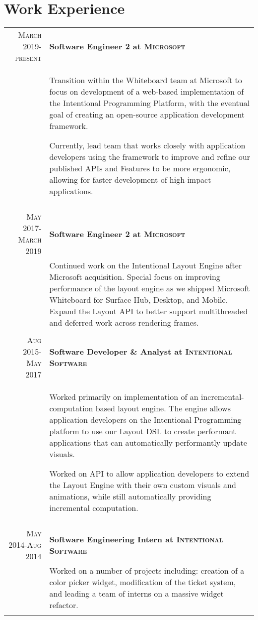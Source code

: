 \documentclass[letterpaper,10pt]{article} %
\newcommand{\work}[3]{ \textsc{#1} & \textbf{#2} \\
& #3\\
\multicolumn{2}{c}{} \\}
\begin{document}
\section{Work Experience}

\begin{tabular}{r|p{14.5cm}} %


\work{March 2019-present}{Software Engineer 2 at \textsc{Microsoft}}{
  Transition within the Whiteboard team at Microsoft to focus on development of a web-based implementation of the Intentional Programming Platform, with the eventual goal of creating an open-source application development framework.

  Currently, lead team that works closely with application developers using the framework to improve and refine our published APIs and Features to be more ergonomic, allowing for faster development of high-impact applications.
}


\work{May 2017-March 2019}{Software Engineer 2 at \textsc{Microsoft}}{
  Continued work on the Intentional Layout Engine after Microsoft acquisition. Special focus on improving performance of the layout engine as we shipped Microsoft Whiteboard
  for Surface Hub, Desktop, and Mobile. Expand the Layout API to better support multithreaded and deferred work across rendering frames.
}


\work{Aug 2015-May 2017}{Software Developer \& Analyst at \textsc{Intentional Software}}{
  Worked primarily on implementation of an incremental-computation based layout engine. The engine allows application developers on the Intentional Programming
  platform to use our Layout DSL to create performant applications that can automatically performantly update visuals. 

  Worked on API to allow application developers to extend the Layout Engine with their own custom visuals and animations, while still automatically providing incremental
  computation.
}


\work{May 2014-Aug 2014}{Software Engineering Intern at \textsc{Intentional Software}}{
	Worked on a number of projects including: creation of a color picker widget, modification of the ticket system, and
	leading a team of interns on a massive widget refactor.
}


\end{tabular}
\end{document}

